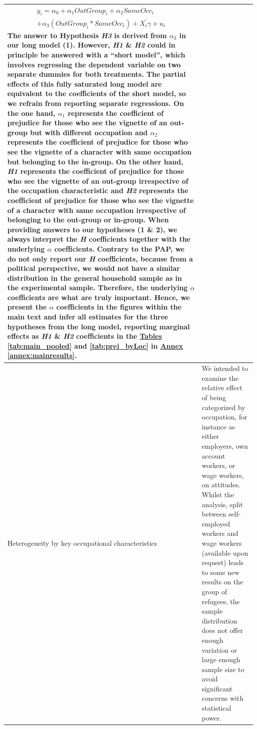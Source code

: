 \documentclass[a4paper,12pt]{article}
\begin{document}
\begin{appendix}
\begin{longtable}[c]{m{8em}m{12cm}}
    \begin{equation} 
        \label{eq:mainspe}
        \begin{split}
            y_{i} = \alpha_{0} + \alpha_{1} OutGroup_{i} + \alpha_{2} SameOcc_{i} \\
            + \alpha_{3} (OutGroup_{i} * SameOcc_{i}) + X_{i}^{'} \gamma + u_{i}
        \end{split}
    \end{equation} 
    The answer to Hypothesis \textbf{\textit{H3}} is derived from $\alpha_{3}$ in our long model (1). However, \textbf{\textit{H1}} \& \textbf{\textit{H2}} could in principle be answered with a ``short model'', which involves regressing the dependent variable on two separate dummies for both treatments. The partial effects of this fully saturated long model are equivalent to the coefficients of the short model, so we refrain from reporting separate regressions. On the one hand, $\alpha_{1}$ represents the coefficient of prejudice for those who see the vignette of an out-group but with different occupation and $\alpha_{2}$ represents the coefficient of prejudice for those who see the vignette of a character with same occupation but belonging to the in-group. On the other hand, \textit{H1} represents the coefficient of prejudice for those who see the vignette of an out-group irrespective of the occupation characteristic and \textit{H2} represents the coefficient of prejudice for those who see the vignette of a character with same occupation irrespective of belonging to the out-group or in-group. When providing answers to our hypotheses (1 \& 2), we always interpret the \textit{H} coefficients together with the underlying $\alpha$ coefficients. Contrary to the PAP, we do not only report our \textit{H} coefficients, because from a political perspective, we would not have a similar distribution in the general household sample as in the experimental sample. Therefore, the underlying $\alpha$ coefficients are what are truly important. Hence, we present the $\alpha$ coefficients in the figures within the main text and infer all estimates for the three hypotheses from the long model, reporting marginal effects as \textit{H1} \& \textit{H2} coefficients in the \hyperref[tab:main_pooled]{Tables} \ref{tab:main_pooled} and \ref{tab:prej_byLoc}  in \hyperref[annex:mainresults]{Annex} \ref{annex:mainresults}. \\
    \hline
    Heterogeneity by key occupational characteristics & We intended to examine the relative effect of being categorized by occupation, for instance as either employers, own account workers, or wage workers, on attitudes. Whilst the analysis, split between self-employed workers and wage workers (available upon request) leads to some new results on the group of refugees, the sample distribution does not offer enough variation or large enough sample size to avoid significant concerns with statistical power.\\

\end{longtable}
\end{appendix}
\end{document}
